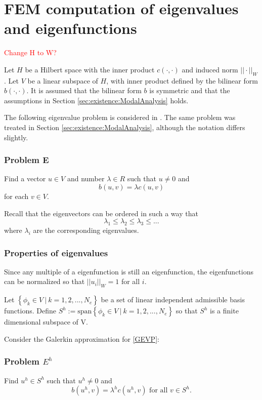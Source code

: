 \documentclass[../../main.tex]{subfiles}
\begin{document}
\section{FEM computation of eigenvalues and eigenfunctions}
\textcolor{red}{Change H to W?}

Let $H$ be a Hilbert space with the inner product $c(\cdot,\cdot)$ and induced norm $||\cdot||_{W}$. Let $V$ be a linear subspace of $H$, with inner product defined by the bilinear form $b(\cdot,\cdot)$. It is assumed that the bilinear form $b$ is symmetric and that the assumptions in Section \ref{sec:existence:ModalAnalysis} holds.

The following eigenvalue problem is considered in \cite{SF73}. The same problem was treated in Section \ref{sec:existence:ModalAnalysis}, although the notation differs slightly.


\subsubsection*{Problem E}
Find a vector $u \in V$ and number $\lambda \in R$ such that $u \neq 0$ and
\begin{equation}
	b(u,v) = \lambda c(u,v) \label{GEVP}
\end{equation} for each $v \in V$.

Recall that the eigenvectors can be ordered in such a way that \[\lambda_1 \leq \lambda_2 \leq \lambda_3 \leq ...\] where $\lambda_i$ are the corresponding eigenvalues.

\subsubsection*{Properties of eigenvalues}
Since any multiple of a eigenfunction is still an eigenfunction, the eigenfunctions can be normalized so that $||u_i||_{W} = 1$ for all $i$.

Let $\left\{ \phi_k \in V \ | \  k = 1,2,...,N_e \right\}$ be a set of linear independent admissible basis functions. Define $S^h := \text{span}\left\{\phi_k \in V \ | \ k = 1,2,...,N_e\right\}$ so that $S^h$ is a finite dimensional subspace of V. \label{sym:natural} \label{sym:Sh1}

Consider the Galerkin approximation for \eqref{GEVP}:
\subsubsection*{Problem $E^h$}
Find $u^h \in S^h$ such that $u^h \neq 0$ and \[b(u^h, v) = \lambda^h c(u^h,v) \textrm{ for all } v \in S^h.\] 
\end{document}
